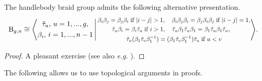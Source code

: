 \documentclass[a4paper,11pt]{amsart}
\newcommand{\eg}{\textsl{e.g.}}
\renewcommand{\dots}{\text{...}}
\newcommand{\setstuff}[1]{\mathrm{#1}}
\numberwithin{equation}{section}
\begin{document}
\begin{proposition}\label{proposition:alternative-presentation}
The handlebody braid group admits the following alternative presentation.
\begin{gather*}
\setstuff{B}_{g,n}\cong
\Bigg\langle
\begin{gathered}
\tilde{\tau}_{u},\,u=1,\dots,g,
\\
\beta_{i},\,i=1,\dots,n-1
\end{gathered}
\,\Bigg\vert\,
\scalebox{0.85}{$
\begin{gathered}
\beta_{i}\beta_{j}=\beta_{j}\beta_{i}\;\text{if }|i-j|>1,\quad
\beta_{i}\beta_{j}\beta_{i}=\beta_{j}\beta_{i}\beta_{j}\;\text{if }|i-j|=1,
\\
\tilde{\tau}_{u}\beta_{i}
=\beta_{i}\tilde{\tau}_{u}\;\text{if }i>1,
\quad
\tilde{\tau}_{u}\beta_{1}\tilde{\tau}_{u}\beta_{1}
=
\beta_{1}\tilde{\tau}_{u}\beta_{1}\tilde{\tau}_{u},
\quad
\\
\tilde{\tau}_{u}(\beta_{1}\tilde{\tau}_{v}\beta_{1}^{-1})
=(\beta_{1}\tilde{\tau}_{v}\beta_{1}^{-1})\tilde{\tau}_{u}
\;\text{if }u<v
\end{gathered}
$}
\Bigg\rangle.
\end{gather*}
\end{proposition}

\begin{proof}
A pleasant exercise (see also {\eg} \cite[Section 5]{HaOlLa-handlebodies}).
\end{proof}

The following allows us to use topological 
arguments in proofs.
\end{document}
